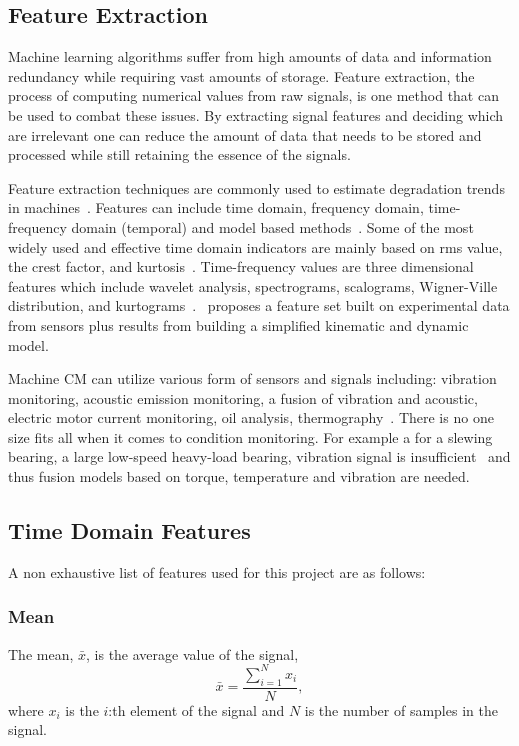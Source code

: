 \documentclass[]{article}
\begin{document}
\subsection{Feature Extraction}
Machine learning algorithms suffer from high amounts of data and information redundancy while requiring vast amounts of storage. Feature extraction, the process of computing numerical values from raw signals, is one method that can be used to combat these issues. By extracting signal features and deciding which are irrelevant one can reduce the amount of data that needs to be stored and processed while still retaining the essence of the signals.

Feature extraction techniques are commonly used to estimate degradation trends in machines~\cite{caesarendra2017review,adams2017comparison,hong2014condition}.
Features can include time domain, frequency domain, time-frequency domain (temporal) and model based methods~\cite{teti2010advanced}. Some of the most widely used and effective time domain indicators are mainly based on rms value, the crest factor, and kurtosis~\cite{soualhi2021novel}. Time-frequency values are three dimensional features which include wavelet analysis, spectrograms, scalograms, Wigner-Ville distribution, and kurtograms~\cite{soualhi2021novel}.~\cite{d2019physical} proposes a feature set built on experimental data from sensors plus results from building a simplified kinematic and dynamic model.

Machine \gls{CM} can utilize various form of sensors and signals including: vibration monitoring, acoustic emission monitoring, a fusion of vibration and acoustic, electric motor current monitoring, oil analysis, thermography~\cite{ahmed2020condition}. There is no one size fits all when it comes to condition monitoring. For example a for a slewing bearing, a large low-speed heavy-load bearing, vibration signal is insufficient~\cite{wang2016multiple} and thus fusion models based on torque, temperature and vibration are needed.

\subsection{Time Domain Features} 	
A non exhaustive list of features used for this project are as follows:
\subsubsection*{Mean}
The mean, $ \bar{x} $, is the average value of the signal,
\begin{equation}
\bar{x} = \frac{\sum^N_{i=1} x_i}{N},
\end{equation}
where $ x_i $ is the $ i $:th element of the signal and $ N $ is the number of samples in the signal.
\end{document}
